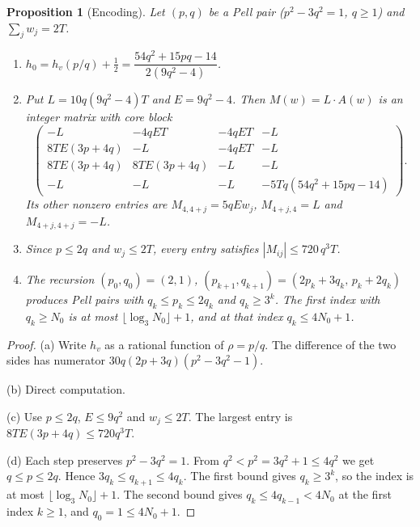 \documentclass[11pt,a4paper]{article}
\theoremstyle{plain}
\newtheorem{proposition}[theorem]{Proposition}
\theoremstyle{definition}
\theoremstyle{remark}
\begin{document}
\begin{proposition}[Encoding]\label{prop:encoding}
Let $(p,q)$ be a Pell pair ($p^2-3q^2=1$, $q\ge1$) and $\sum_jw_j=2T$.
\begin{enumerate}[label=(\alph*)]
\item $h_0=h_v(p/q)+\tfrac12=\dfrac{54q^2+15pq-14}{2(9q^2-4)}$.
\item Put $L=10q(9q^2-4)T$ and $E=9q^2-4$. Then $M(w)=L\cdot A(w)$ is an integer matrix
with core block
\[
\begin{pmatrix}
-L&-4qET&-4qET&-L\\
8TE(3p+4q)&-L&-4qET&-L\\
8TE(3p+4q)&8TE(3p+4q)&-L&-L\\
-L&-L&-L&-5Tq(54q^2+15pq-14)
\end{pmatrix}.
\]
Its other nonzero entries are $M_{4,4+j}=5qEw_j$, $M_{4+j,4}=L$ and $M_{4+j,4+j}=-L$.
\item Since $p\le2q$ and $w_j\le2T$, every entry satisfies $|M_{ij}|\le720\,q^3T$.
\item The recursion $(p_0,q_0)=(2,1)$, $(p_{k+1},q_{k+1})=(2p_k+3q_k,\,p_k+2q_k)$ produces
Pell pairs with $q_k\le p_k\le2q_k$ and $q_k\ge3^k$. The first index with $q_k\ge N_0$ is
at most $\lfloor\log_3N_0\rfloor+1$, and at that index $q_k\le4N_0+1$.
\end{enumerate}
\end{proposition}
\begin{proof}
(a) Write $h_v$ as a rational function of $\rho=p/q$. The difference of the two sides has
numerator $30q(2p+3q)(p^2-3q^2-1)$.

(b) Direct computation.

(c) Use $p\le2q$, $E\le9q^2$ and $w_j\le2T$. The largest entry is $8TE(3p+4q)\le720q^3T$.

(d) Each step preserves $p^2-3q^2=1$. From $q^2<p^2=3q^2+1\le4q^2$ we get
$q\le p\le2q$. Hence $3q_k\le q_{k+1}\le4q_k$. The first bound gives $q_k\ge3^k$, so the
index is at most $\lfloor\log_3N_0\rfloor+1$. The second bound gives $q_k\le4q_{k-1}<4N_0$
at the first index $k\ge1$, and $q_0=1\le4N_0+1$.
\end{proof}
\end{document}
